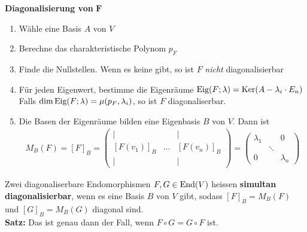 \begin{mdframed}
\textbf{Diagonalisierung von }$\mathbf{F}$\\
\begin{enumerate}[{(}1{.)}]
    \item	Wähle eine Basis $A$ von $V$
    
    \item   Berechne das charakteristische Polynom $p_F$
    
    \item Finde die Nullstellen. Wenn es keine gibt, so ist $F$ \emph{nicht} diagonalisierbar
    
    \item Für jeden Eigenwert, bestimme die Eigenräume $\text{Eig}(F;\lambda) = \text{Ker}(A - \lambda_i \cdot E_n)$\\
    Falls $\dim \text{Eig}(F;\lambda) = \mu(p_F, \lambda_i)$, so ist $F$ diagonaliserbar.
    
    \item Die Basen der Eigenräume bilden eine Eigenbasis $B$ von $V$. Dann ist 
    \begin{align*}
        M_{B}^{}(F) = [F]_B = \begin{pmatrix}
        | &  & |\\
        [F(v_1)]_B & \ldots & [F(v_n)]_B\\
        | &  & |
        \end{pmatrix}
        = \begin{pmatrix}
            \lambda_1 & & 0\\
            & \ddots & \\
            0 & & \lambda_n
        \end{pmatrix}
    \end{align*}
\end{enumerate}
\end{mdframed}
\newpage
Zwei diagonaliserbare Endomorphismen $F,G \in \text{End}(V)$ heissen \textbf{simultan diagonalisierbar}, wenn es eine Basis $B$ von $V$ gibt, sodass $[F]_B = M_{B}^{}(F)$ und $[G]_B = M_{B}^{}(G)$ diagonal sind.\\
\textbf{Satz:} Das ist genau dann der Fall, wenn $F \circ G = G \circ F$ ist.
